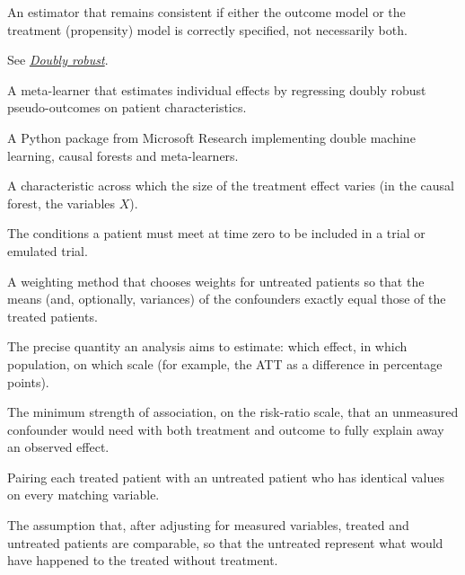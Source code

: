 \begin{description}[style=nextline, leftmargin=1.2em, itemsep=3pt, font=\normalfont\bfseries]
\item[Doubly robust]\label{gl:dr}
An estimator that remains consistent if either the outcome model or the treatment (propensity) model is correctly specified, not necessarily both.

\item[DR]
See \emph{\hyperref[gl:dr]{Doubly robust}}.

\item[DR-learner]
A meta-learner that estimates individual effects by regressing doubly robust pseudo-outcomes on patient characteristics.

\item[EconML]
A Python package from Microsoft Research implementing double machine learning, causal forests and meta-learners.

\item[Effect modifier]
A characteristic across which the size of the treatment effect varies (in the causal forest, the variables $X$).

\item[Eligibility criteria]
The conditions a patient must meet at time zero to be included in a trial or emulated trial.

\item[Entropy balancing]
A weighting method that chooses weights for untreated patients so that the means (and, optionally, variances) of the confounders exactly equal those of the treated patients.

\item[Estimand]
The precise quantity an analysis aims to estimate: which effect, in which population, on which scale (for example, the ATT as a difference in percentage points).

\item[E-value]
The minimum strength of association, on the risk-ratio scale, that an unmeasured confounder would need with both treatment and outcome to fully explain away an observed effect.

\item[Exact matching]
Pairing each treated patient with an untreated patient who has identical values on every matching variable.

\item[Exchangeability (no unmeasured confounding)]
The assumption that, after adjusting for measured variables, treated and untreated patients are comparable, so that the untreated represent what would have happened to the treated without treatment.


\end{description}
